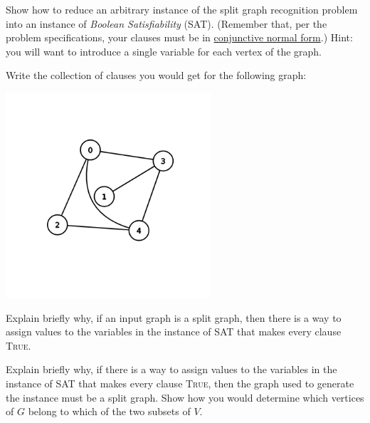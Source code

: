 \begin{questions}
\question[4] Show how  to reduce an arbitrary  instance of the split  graph recognition problem
  into  an instance  of  \emph {Boolean  Satisfiability}  (SAT). (Remember that, per the problem specifications, your clauses must be in \href{https://en.wikipedia.org/wiki/Conjunctive_normal_form}{conjunctive normal form}.) Hint:  you  will want  to
  introduce a single variable for each vertex of the graph.

  \ifsolutions\fi

  \question[1] Write the collection of clauses you would get for the following graph:
  
   \centerline{\includegraphics[width=3in]{graph1.png}}

  \ifsolutions\fi

\question[3] Explain briefly why, if  an input graph is a split graph, then  there is a way to
  assign  values  to  the variables  in  the  instance  of  SAT that  makes  every  clause
  \textsc{True}.

  \ifsolutions\fi

\question[3] Explain briefly why,  if there is a way to assign values  to the variables in the
  instance of SAT that  makes every clause \textsc{True}, then the  graph used to generate
  the instance must be  a split graph. Show how you would determine  which vertices of $G$
  belong to which of the two subsets of $V$.

  \ifsolutions\fi
\end{questions}

